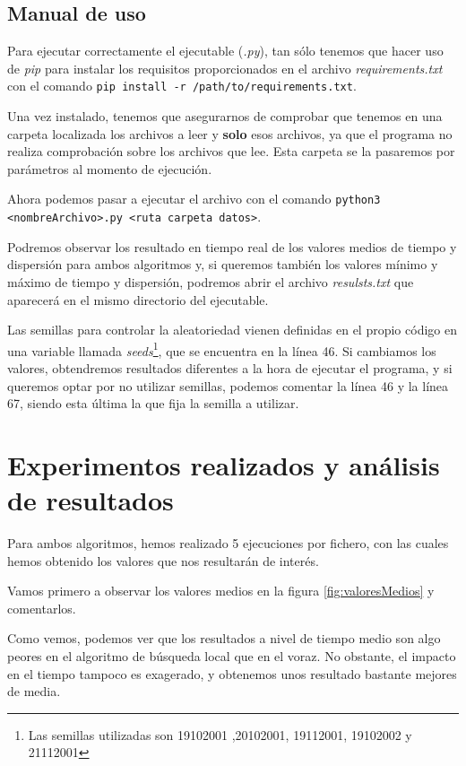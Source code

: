 \subsection{Manual de uso}

Para ejecutar correctamente el ejecutable (\textit{.py}), tan sólo tenemos que hacer uso de \textit{pip} para instalar los requisitos proporcionados en el archivo \textit{requirements.txt}
con el comando \texttt{pip install -r /path/to/requirements.txt}.

Una vez instalado, tenemos que asegurarnos de comprobar que tenemos en una carpeta localizada los archivos a leer y \textbf{solo} esos archivos, ya que el programa no realiza comprobación sobre los archivos que lee. Esta carpeta se la pasaremos por parámetros al momento de ejecución.

Ahora podemos pasar a ejecutar el archivo con el comando \texttt{python3 <nombreArchivo>.py <ruta carpeta datos>}.

Podremos observar los resultado en tiempo real de los valores medios de tiempo y dispersión para ambos algoritmos y, si queremos también los valores mínimo y máximo de tiempo y dispersión, podremos abrir el archivo \textit{resulsts.txt} que aparecerá en el mismo directorio del ejecutable.

Las semillas para controlar la aleatoriedad vienen definidas en el propio código en una variable llamada \textit{seeds}\footnote{Las semillas utilizadas son 19102001 ,20102001, 19112001, 19102002 y 21112001}, que se encuentra en la línea 46. Si cambiamos los valores, obtendremos resultados diferentes a la hora de ejecutar el programa, y si queremos optar por no utilizar semillas, podemos comentar la línea 46 y la línea 67, siendo esta última la que fija la semilla a utilizar.
\newpage

\section{Experimentos realizados y análisis de resultados}

Para ambos algoritmos, hemos realizado 5 ejecuciones por fichero, con las cuales hemos obtenido los valores que nos resultarán de interés.

Vamos primero a observar los valores medios en la figura \ref{fig:valoresMedios} y comentarlos.

Como vemos, podemos ver que los resultados a nivel de tiempo medio son algo peores en el algoritmo de búsqueda local que en el voraz.
No obstante, el impacto en el tiempo tampoco es exagerado, y obtenemos unos resultado bastante mejores de media.

